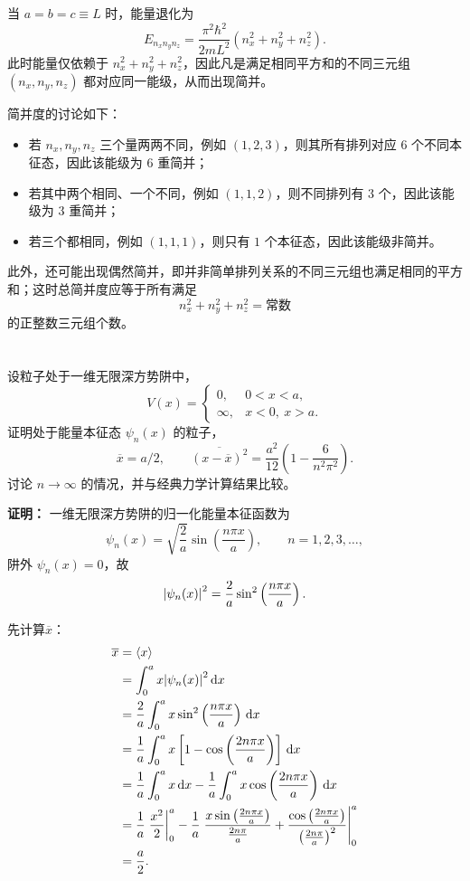 \documentclass[12pt,a4paper]{article}
\begin{document}
当 $a=b=c\equiv L$ 时，能量退化为
\[
E_{n_xn_yn_z}=\frac{\pi^2\hbar^2}{2mL^2}\left( n_x^2+n_y^2+n_z^2 \right).
\]
此时能量仅依赖于 $n_x^2+n_y^2+n_z^2$，因此凡是满足相同平方和的不同三元组 $(n_x,n_y,n_z)$ 都对应同一能级，从而出现简并。

简并度的讨论如下：
\begin{itemize}
  \item 若 $n_x,n_y,n_z$ 三个量两两不同，例如 $(1,2,3)$，则其所有排列对应 $6$ 个不同本征态，因此该能级为 $6$ 重简并；
  \item 若其中两个相同、一个不同，例如 $(1,1,2)$，则不同排列有 $3$ 个，因此该能级为 $3$ 重简并；
  \item 若三个都相同，例如 $(1,1,1)$，则只有 $1$ 个本征态，因此该能级非简并。
\end{itemize}

此外，还可能出现偶然简并，即并非简单排列关系的不同三元组也满足相同的平方和；这时总简并度应等于所有满足
\[
n_x^2+n_y^2+n_z^2=\text{常数}
\]
的正整数三元组个数。

\section{}
设粒子处于一维无限深方势阱中，
\[
V(x)=
\begin{cases}
0, & 0<x<a,\\
\infty, & x<0,\ x>a.
\end{cases}
\]
证明处于能量本征态 $\psi_n(x)$ 的粒子，
\[
\overline{x}=a/2, \qquad \overline{(x-\overline{x})^2}=\frac{a^2}{12}\left(1-\frac{6}{n^2\pi^2}\right).
\]
讨论 $n\to\infty$ 的情况，并与经典力学计算结果比较。

\vspace{0.5cm}

\noindent\textbf{证明：}
一维无限深方势阱的归一化能量本征函数为
\[
\psi_n(x)=\sqrt{\frac{2}{a}}\sin\left(\frac{n\pi x}{a}\right),\qquad n=1,2,3,\dots,
\]
阱外 $\psi_n(x)=0$，故
\[
\abs{\psi_n(x)}^2=\frac{2}{a}\sin^2\left(\frac{n\pi x}{a}\right).
\]

先计算$\overline{x}$：
\begin{align*}
\overline{x}
&=\ev{x} \\
&=\int_0^a x\abs{\psi_n(x)}^2\,\dd x \\
&=\frac{2}{a}\int_0^a x\sin^2\left(\frac{n\pi x}{a}\right)\,\dd x \\
&=\frac{1}{a}\int_0^a x\left[1-\cos\left(\frac{2n\pi x}{a}\right)\right]\,\dd x \\
&=\frac{1}{a}\int_0^a x\,\dd x-\frac{1}{a}\int_0^a x\cos\left(\frac{2n\pi x}{a}\right)\,\dd x \\
&=\frac{1}{a}\eval{\frac{x^2}{2}}_0^a-\frac{1}{a}\eval{\frac{x\sin\left(\frac{2n\pi x}{a}\right)}{\frac{2n\pi}{a}}+\frac{\cos\left(\frac{2n\pi x}{a}\right)}{\left(\frac{2n\pi}{a}\right)^2}}_0^a \\
&=\frac{a}{2}.
\end{align*}
\end{document}

